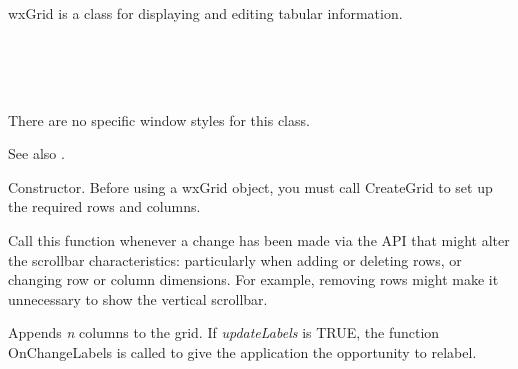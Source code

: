 \section{}\label{wxgrid}

wxGrid is a class for displaying and editing tabular information.


\\
\\
\\


There are no specific window styles for this class.

See also .




\label{wxgridconstr}


Constructor. Before using a wxGrid object, you must call CreateGrid to set up the required rows and columns.

\label{wxgridadjustscrollbars}


Call this function whenever a change has been made via the API that might alter the scrollbar characteristics:
particularly when adding or deleting rows, or changing row or column dimensions. For example,
removing rows might make it unnecessary to show the vertical scrollbar.

\label{wxgridappendcols}


Appends {\it n} columns to the grid. If {\it updateLabels} is TRUE,
the function OnChangeLabels is called to give the application the opportunity to relabel.

